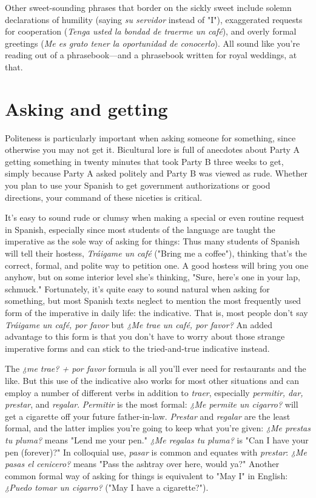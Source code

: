 \documentclass[14pt,a4paper,oneside]{memoir}
\begin{document}
Other sweet-sounding phrases that border on the sickly sweet
include solemn declarations of humility (saying \emph{su servidor} instead of
"I"), exaggerated requests for cooperation (\emph{Tenga usted la bondad de
	traerme un café}), and overly formal greetings (\emph{Me es grato tener la
	oportunidad de conocerlo}). All sound like you're reading out of a
phrasebook---and a phrasebook written for royal weddings, at that.

\section{Asking and getting}

Politeness is particularly important when asking someone for
something, since otherwise you may not get it. Bicultural lore is full of
anecdotes about Party A getting something in twenty minutes that
took Party B three weeks to get, simply because Party A asked politely
and Party B was viewed as rude. Whether you plan to use your Spanish
to get government authorizations or good directions, your command of
these niceties is critical.

It's easy to sound rude or clumsy when making a special or
even routine request in Spanish, especially since most students of the
language are taught the imperative as the sole way of asking for things:
Thus many students of Spanish will tell their hostess, \emph{Tráigame un café} ("Bring me a coffee"), thinking that's the correct, formal, and polite way to petition one. A good hostess will bring you one anyhow,
but on some interior level she's thinking, "Sure, here's one in your lap,
schmuck." Fortunately, it's quite easy to sound natural when asking
for something, but most Spanish texts neglect to mention the most frequently used form of the imperative in daily life: the indicative. That
is, most people don't say \emph{Tráigame un café, por favor} but \emph{¿Me trae un
	café, por favor?} An added advantage to this form is that you don't have
to worry about those strange imperative forms and can stick to the
tried-and-true indicative instead.

The \emph{¿me trae? + por favor} formula is all you'll ever need for
restaurants and the like. But this use of the indicative also works for
most other situations and can employ a number of different verbs in
addition to \emph{traer}, especially \emph{permitir, dar, prestar}, and \emph{regalar}. \emph{Permitir} is the most formal: \emph{¿Me permite un cigarro?} will get a cigarette off
your future father-in-law. \emph{Prestar} and \emph{regalar} are the least formal, and
the latter implies you're going to keep what you're given: \emph{¿Me prestas
	tu pluma?} means "Lend me your pen." \emph{¿Me regalas tu pluma?} is "Can
I have your pen (forever)?" In colloquial use, \emph{pasar} is common and
equates with \emph{prestar}: \emph{¿Me pasas el cenicero?} means "Pass the ashtray
over here, would ya?" Another common formal way of asking for
things is equivalent to "May I" in English: \emph{¿Puedo tomar un cigarro?}
("May I have a cigarette?").
\end{document}
